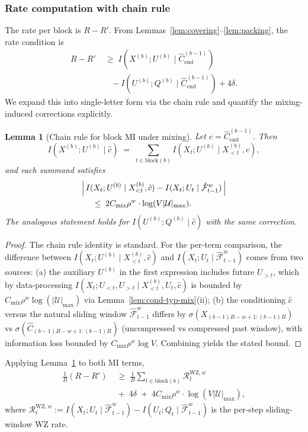 \documentclass[11pt]{article}
\newcommand{\F}{\mathcal{F}}
\newcommand{\Fhat}{\hat{\F}}
\theoremstyle{plain}
\newtheorem{lemma}[theorem]{Lemma}
\theoremstyle{definition}
\theoremstyle{remark}
\begin{document}
\subsubsection{Rate computation with chain rule}

The rate per block is $R - R'$. From Lemmas~\ref{lem:covering}--\ref{lem:packing},
the rate condition is
\[
\begin{split}
R - R'
&\;\geq\;
I(X^{(b)}; U^{(b)} \mid \hat C^{(b-1)}_{\mathrm{end}})\\
&\quad - I(U^{(b)}; Q^{(b)} \mid \hat C^{(b-1)}_{\mathrm{end}})
+ 4\delta.
\end{split}
\]
We expand this into single-letter form via the chain rule and quantify
the mixing-induced corrections explicitly.

\begin{lemma}[Chain rule for block MI under mixing]\label{lem:chain-rule}
Let $\hat c = \hat C^{(b-1)}_{\mathrm{end}}$. Then
\[
I(X^{(b)}; U^{(b)} \mid \hat c)
\;=\;
\sum_{t \in \mathrm{block}(b)} I(X_t; U^{(b)} \mid X_{<t}^{(b)}, \hat c),
\]
and each summand satisfies
\[
\begin{split}
&\Bigl|\, I(X_t; U^{(b)} \mid X_{<t}^{(b)}, \hat c) - I(X_t; U_t \mid \Fhat_{t-1}^w) \,\Bigr|\\
&\quad\;\leq\;
2 C_{\mathrm{mix}}\rho^w \cdot \log(V|\mathcal{U}|_{\max}).
\end{split}
\]
The analogous statement holds for $I(U^{(b)}; Q^{(b)} \mid \hat c)$ with
the same correction.
\end{lemma}

\begin{proof}
The chain rule identity is standard. For the per-term comparison, the
difference between $I(X_t; U^{(b)} \mid X_{<t}^{(b)}, \hat c)$ and
$I(X_t; U_t \mid \Fhat_{t-1}^w)$ comes from two sources: (a) the
auxiliary $U^{(b)}$ in the first expression includes future $U_{>t}$,
which by data-processing $I(X_t; U_{<t}, U_{>t} \mid X_{<t}^{(b)}, U_t, \hat c)$
is bounded by $C_{\mathrm{mix}}\rho^w \log(|\mathcal{U}|_{\max})$ via
Lemma~\ref{lem:cond-typ-mix}(ii); (b) the conditioning $\hat c$
versus the natural sliding window $\Fhat_{t-1}^w$ differs by
$\sigma(X_{(b-1)B-w+1:(b-1)B})$ vs $\sigma(\hat C_{(b-1)B-w+1:(b-1)B})$
(uncompressed vs compressed past window), with information loss bounded
by $C_{\mathrm{mix}}\rho^w \log V$. Combining yields the stated bound.
\end{proof}

Applying Lemma~\ref{lem:chain-rule} to both MI terms,
\[
\begin{split}
\frac{1}{B}(R - R')
&\;\geq\;
\frac{1}{B}\sum_{t \in \mathrm{block}(b)} \mathcal{R}_t^{\mathrm{WZ},w}\\
&\;+\; 4\delta \;+\; 4 C_{\mathrm{mix}}\rho^w \cdot \log(V|\mathcal{U}|_{\max}),
\end{split}
\]
where $\mathcal{R}_t^{\mathrm{WZ},w} := I(X_t; U_t \mid \Fhat_{t-1}^w) - I(U_t; Q_t \mid \Fhat_{t-1}^w)$
is the per-step sliding-window WZ rate.
\end{document}
